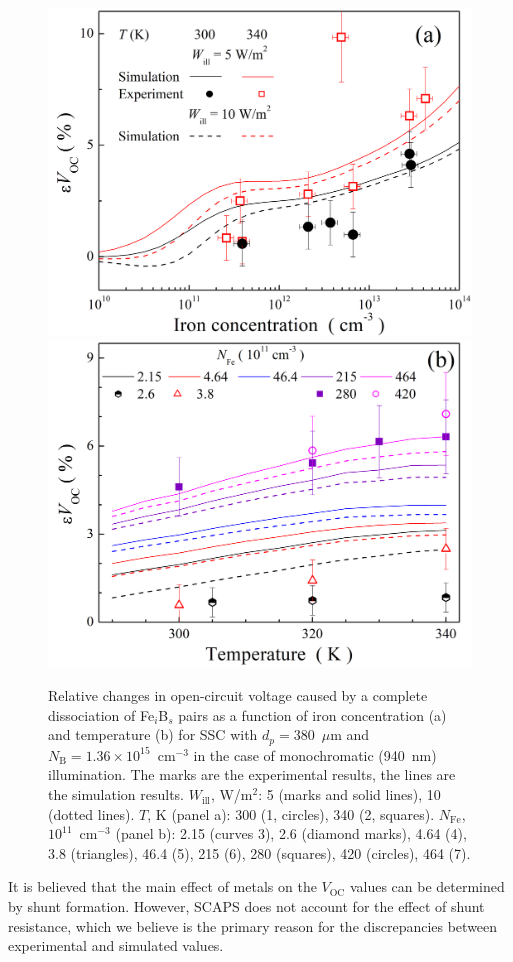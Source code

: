 \documentclass[a4paper,fleqn]{cas-sc}
\begin{document}
\begin{figure}
	\centering
     \includegraphics[width=0.4\linewidth]{Fig7a.png}
     \includegraphics[width=0.4\linewidth]{Fig7b.png}
	  \caption{Relative changes in open-circuit voltage caused by a complete
       dissociation of Fe$_i$B$_s$ pairs as a function of iron concentration (a) and
       temperature (b) for SSC with $d_p=380$~$\mu$m and $N_\mathrm{B}=1.36\times10^{15}$~cm$^{-3}$
       in the case of monochromatic (940~nm) illumination.
       The marks are the experimental results, the lines are the simulation results.
       $W_\mathrm{ill}$, W/m$^{2}$: 5 (marks and solid lines), 10 (dotted lines).
       $T$, K (panel a): 300 (1, circles), 340 (2, squares).
       $N_\mathrm{Fe}$, $10^{11}$~cm$^{-3}$ (panel b): 2.15 (curves 3), 2.6 (diamond marks), 4.64 (4),
       3.8 (triangles), 46.4 (5), 215 (6), 280 (squares), 420 (circles), 464 (7).
}\label{fig7}
\end{figure}

It is believed \cite{YangHandbookPVSi} that the main effect of metals on the $V_\mathrm{OC}$ values can be determined by shunt formation.
However, SCAPS does not account for the effect of shunt resistance,
which we believe is the primary reason for the discrepancies between experimental and simulated values.
\end{document}
